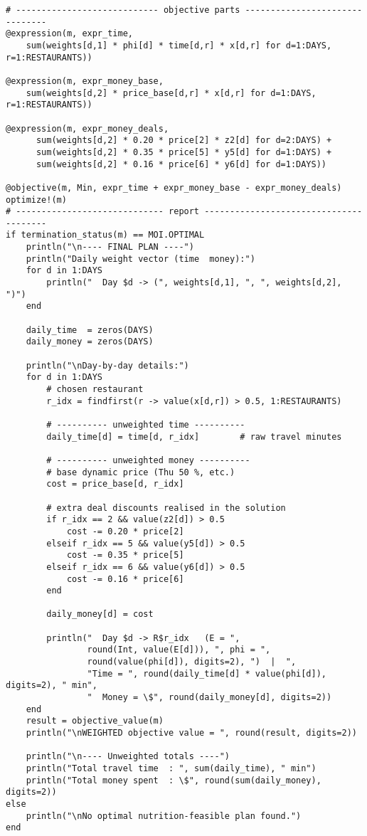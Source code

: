 \begin{verbatim}
# ---------------------------- objective parts -------------------------------
@expression(m, expr_time,
    sum(weights[d,1] * phi[d] * time[d,r] * x[d,r] for d=1:DAYS, r=1:RESTAURANTS))

@expression(m, expr_money_base,
    sum(weights[d,2] * price_base[d,r] * x[d,r] for d=1:DAYS, r=1:RESTAURANTS))

@expression(m, expr_money_deals,
      sum(weights[d,2] * 0.20 * price[2] * z2[d] for d=2:DAYS) +
      sum(weights[d,2] * 0.35 * price[5] * y5[d] for d=1:DAYS) +
      sum(weights[d,2] * 0.16 * price[6] * y6[d] for d=1:DAYS))

@objective(m, Min, expr_time + expr_money_base - expr_money_deals)
optimize!(m)  
# ----------------------------- report ---------------------------------------
if termination_status(m) == MOI.OPTIMAL
    println("\n---- FINAL PLAN ----")
    println("Daily weight vector (time  money):")
    for d in 1:DAYS
        println("  Day $d -> (", weights[d,1], ", ", weights[d,2], ")")
    end

    daily_time  = zeros(DAYS)
    daily_money = zeros(DAYS)

    println("\nDay‑by‑day details:")
    for d in 1:DAYS
        # chosen restaurant
        r_idx = findfirst(r -> value(x[d,r]) > 0.5, 1:RESTAURANTS)

        # ---------- unweighted time ----------
        daily_time[d] = time[d, r_idx]        # raw travel minutes

        # ---------- unweighted money ----------
        # base dynamic price (Thu 50 %, etc.)
        cost = price_base[d, r_idx]

        # extra deal discounts realised in the solution
        if r_idx == 2 && value(z2[d]) > 0.5
            cost -= 0.20 * price[2]
        elseif r_idx == 5 && value(y5[d]) > 0.5
            cost -= 0.35 * price[5]
        elseif r_idx == 6 && value(y6[d]) > 0.5
            cost -= 0.16 * price[6]
        end
        
        daily_money[d] = cost

        println("  Day $d -> R$r_idx   (E = ",
                round(Int, value(E[d])), ", phi = ",
                round(value(phi[d]), digits=2), ")  |  ",
                "Time = ", round(daily_time[d] * value(phi[d]), digits=2), " min",
                "  Money = \$", round(daily_money[d], digits=2))
    end
    result = objective_value(m)
    println("\nWEIGHTED objective value = ", round(result, digits=2))

    println("\n---- Unweighted totals ----")
    println("Total travel time  : ", sum(daily_time), " min")
    println("Total money spent  : \$", round(sum(daily_money), digits=2))
else
    println("\nNo optimal nutrition‑feasible plan found.")
end


\end{verbatim}
